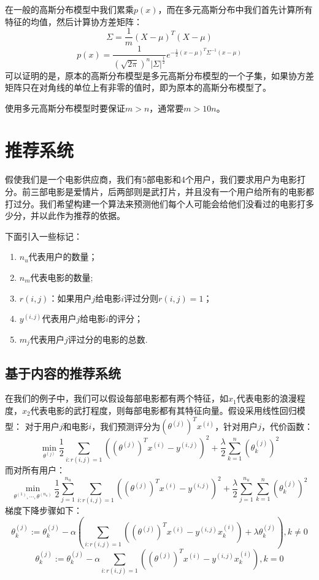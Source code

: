 \documentclass[cn,hazy,blue,normal,14pt]{elegantnote}
\begin{document}
在一般的高斯分布模型中我们累乘$p(x)$，而在多元高斯分布中我们首先计算所有特征的均值，然后计算协方差矩阵：
$$
\Sigma=\frac{1}{m}(X-\mu)^T(X-\mu)
$$
$$
p(x)=\frac{1}{(\sqrt{2\pi})^n |\Sigma|^{\frac{1}{2}}}e^{-\frac{1}{2}(x-\mu)^T\Sigma^{-1}(x-\mu)}
$$
可以证明的是，原本的高斯分布模型是多元高斯分布模型的一个子集，如果协方差矩阵只在对角线的单位上有非零的值时，即为原本的高斯分布模型了。

使用多元高斯分布模型时要保证$m>n$，通常要$m>10n$。
\section{推荐系统}
\begin{example}
假使我们是一个电影供应商，我们有5部电影和4个用户，我们要求用户为电影打分。前三部电影是爱情片，后两部则是武打片，并且没有一个用户给所有的电影都打过分。我们希望构建一个算法来预测他们每个人可能会给他们没看过的电影打多少分，并以此作为推荐的依据。
\end{example}
下面引入一些标记：
\begin{enumerate}
    \item $n_u$代表用户的数量；
    \item $n_m$代表电影的数量;
    \item $r(i,j)$：如果用户$j$给电影$i$评过分则$r(i,j)=1$；
    \item $y^{(i,j)}$代表用户$j$给电影$i$的评分；
    \item $m_j$代表用户$j$评过分的电影的总数.
\end{enumerate}
\subsection{基于内容的推荐系统}
在我们的例子中，我们可以假设每部电影都有两个特征，如$x_1$代表电影的浪漫程度，$x_2$代表电影的武打程度，则每部电影都有其特征向量。假设采用线性回归模型：
对于用户$j$和电影$i$，我们预测评分为$(\theta^{(j)})^Tx^{(i)}$，针对用户$j$，代价函数：
$$
\min_{\theta^{(j)}} \frac{1}{2}\sum_{i:r(i,j)=1}((\theta^{(j)})^Tx^{(i)}-y^{(i,j)})^2+\frac{\lambda}{2}\sum_{k=1}^n(\theta_k^{(j)})^2
$$
而对所有用户：
$$
\min_{\theta^{(1)},\cdots,\theta^{(n_u)}} \frac{1}{2}\sum_{j=1}^{n_u}\sum_{i:r(i,j)=1}((\theta^{(j)})^Tx^{(i)}-y^{(i,j)})^2+\frac{\lambda}{2}\sum_{j=1}^{n_u}\sum_{k=1}^n(\theta_k^{(j)})^2
$$
梯度下降步骤如下：
$$
\theta_k^{(j)}:=\theta_k^{(j)}-\alpha\left(\sum_{i:r(i,j)=1}((\theta^{(j)})^Tx^{(i)}-y^{(i,j)}x_k^{(i)}) +\lambda \theta_k^{(j)}\right),k\neq 0
$$
$$
\theta_k^{(j)}:=\theta_k^{(j)}-\alpha\sum_{i:r(i,j)=1}((\theta^{(j)})^Tx^{(i)}-y^{(i,j)}x_k^{(i)}),k=0
$$
\end{document}
